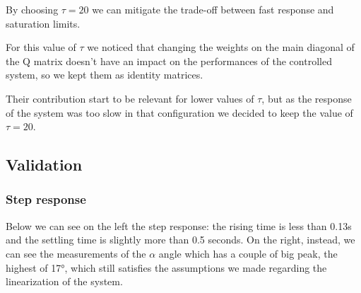 By choosing $\tau = 20$ we can mitigate the trade-off between fast response and saturation limits.

For this value of $\tau$ we noticed that changing the weights on the main diagonal of the Q matrix doesn't have an impact on the performances of the controlled system, so we kept them as identity matrices.

Their contribution start to be relevant for lower values of $\tau$, but as the response of the system was too slow in that configuration we decided to keep the value of $\tau = 20$.

\subsection{Validation}
\subsubsection{Step response}
Below we can see on the left the step response: the rising time is less than 0.13s and the settling time is slightly more than 0.5 seconds. On the right, instead, we can see the measurements of the $\alpha$ angle which has a couple of big peak, the highest of 17°, which still satisfies the assumptions we made regarding the linearization of the system.

